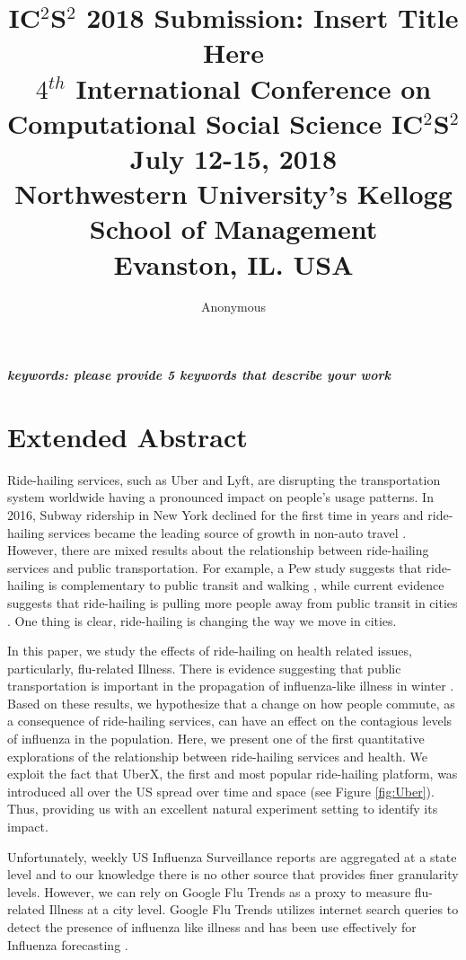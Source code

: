 \documentclass[a4paper,12pt]{article}
\title{IC$^{2}$S$^{2}$ 2018 Submission: Insert Title Here \\
	\normalsize $4$$^{th}$ International Conference on Computational Social Science IC$^{2}$S$^{2}$ \\
	\normalsize July 12-15, 2018 \\
	\normalsize Northwestern University’s Kellogg School of Management \\
	\normalsize Evanston, IL. USA
}
\author[1]{Anonymous} %
\date{}
\begin{document}
\maketitle

\vspace{-2em}

\begin{center}
\textbf{\textit{keywords: please provide 5 keywords that describe your work}}
\newline
\end{center}


\section{Extended Abstract}
Ride-hailing services, such as Uber and Lyft, are disrupting the transportation system worldwide having a pronounced impact on people's usage patterns.  
In 2016, Subway ridership in New York declined for the first time in years and ride-hailing services became the leading source of growth in non-auto travel \cite{schaller2017unsustainable}. However, there are mixed results about the relationship between ride-hailing services and public transportation. For example, a Pew study suggests that ride-hailing is complementary to public transit and walking %
, while current evidence suggests that ride-hailing is pulling more people away from public transit in cities \cite{clewlow2017disruptive}. One thing is clear, ride-hailing is changing the way we move in cities. 

In this paper, we study the effects of ride-hailing on health related issues, particularly, flu-related Illness.
There is evidence suggesting that public transportation is important in the propagation of influenza-like illness in winter \cite{troko2011public,cooley2011role}. Based on these results, we hypothesize that a change on how people commute, as a consequence of ride-hailing services, can have an effect on the contagious levels of influenza in the population.  Here, we present one of the first quantitative explorations of the relationship between ride-hailing services and health. We exploit the fact that UberX, the first and most popular ride-hailing platform, was introduced all over the US spread over time and space (see Figure \ref{fig:Uber}). Thus, providing us with an excellent natural experiment setting to identify its impact. 

Unfortunately, weekly US Influenza Surveillance reports are aggregated at a state level and to our knowledge there is no other source that provides finer granularity levels. However, we can rely on Google Flu Trends as a proxy to measure flu-related Illness at a city level. Google Flu Trends utilizes internet search queries to detect the presence of influenza like illness and has been use effectively for Influenza forecasting \cite{yang2015accurate,dugas2013influenza}.
\end{document}
